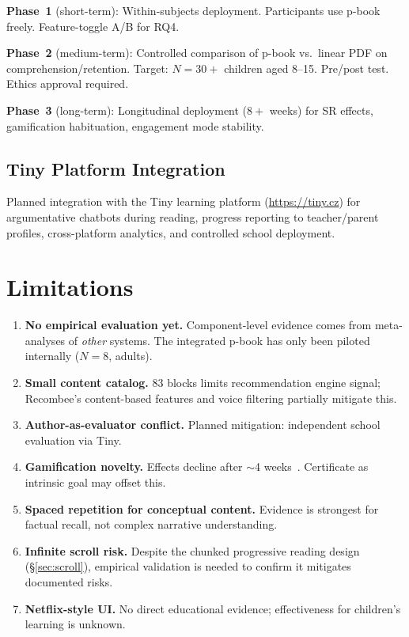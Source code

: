 \documentclass[11pt,a4paper]{article}
\begin{document}
\textbf{Phase~1} (short-term): Within-subjects deployment. Participants use p-book freely. Feature-toggle A/B for RQ4.

\textbf{Phase~2} (medium-term): Controlled comparison of p-book vs.\ linear PDF on comprehension/retention. Target: $N{=}30{+}$ children aged 8--15. Pre/post test. Ethics approval required.

\textbf{Phase~3} (long-term): Longitudinal deployment ($8{+}$ weeks) for SR effects, gamification habituation, engagement mode stability.

\subsection{Tiny Platform Integration}

Planned integration with the Tiny learning platform (\url{https://tiny.cz}) for argumentative chatbots during reading, progress reporting to teacher/parent profiles, cross-platform analytics, and controlled school deployment.

\section{Limitations}\label{sec:limits}

\begin{enumerate}
  \item \textbf{No empirical evaluation yet.} Component-level evidence comes from meta-analyses of \emph{other} systems. The integrated p-book has only been piloted internally ($N{=}8$, adults).
  \item \textbf{Small content catalog.} 83 blocks limits recommendation engine signal; Recombee's content-based features and voice filtering partially mitigate this.
  \item \textbf{Author-as-evaluator conflict.} Planned mitigation: independent school evaluation via Tiny.
  \item \textbf{Gamification novelty.} Effects decline after $\sim$4 weeks~\cite{rodrigues2022}. Certificate as intrinsic goal may offset this.
  \item \textbf{Spaced repetition for conceptual content.} Evidence is strongest for factual recall, not complex narrative understanding.
  \item \textbf{Infinite scroll risk.} Despite the chunked progressive reading design (\S\ref{sec:scroll}), empirical validation is needed to confirm it mitigates documented risks.
  \item \textbf{Netflix-style UI.} No direct educational evidence; effectiveness for children's learning is unknown.
\end{enumerate}
\end{document}
